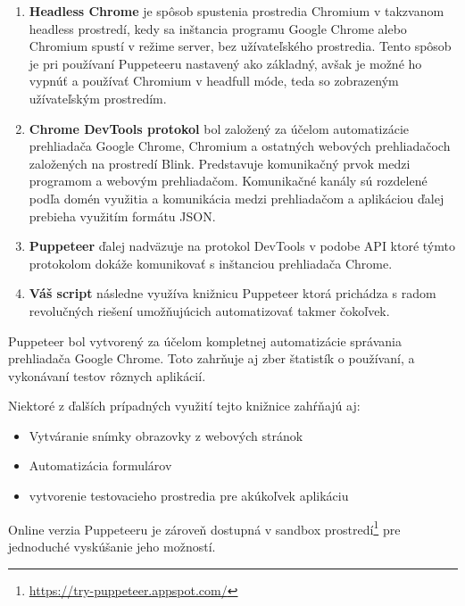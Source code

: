 \begin{enumerate}
  \item \textbf{Headless Chrome} je spôsob spustenia prostredia Chromium v takzvanom headless prostredí, kedy sa inštancia programu Google Chrome alebo Chromium spustí v režime server, bez užívateľského prostredia. Tento spôsob je pri používaní Puppeteeru nastavený ako základný, avšak je možné ho vypnúť a používať Chromium v headfull móde, teda so zobrazeným užívateľským prostredím.\cite{chromium}
  \item \textbf{Chrome DevTools protokol} bol založený za účelom automatizácie prehliadača Google Chrome, Chromium a ostatných webových prehliadačoch založených na prostredí Blink. Predstavuje komunikačný prvok medzi programom a webovým prehliadačom. Komunikačné kanály sú rozdelené podľa domén využitia a komunikácia medzi prehliadačom a aplikáciou ďalej prebieha využitím formátu JSON.\cite{devtools}
  \item \textbf{Puppeteer} ďalej nadväzuje na protokol DevTools v podobe API ktoré týmto protokolom dokáže komunikovať s inštanciou prehliadača Chrome. 
  \item \textbf{Váš script} následne využíva knižnicu Puppeteer ktorá prichádza s radom revolučných riešení umožňujúcich automatizovať takmer čokoľvek.
\end{enumerate}

\newpage

Puppeteer bol vytvorený za účelom kompletnej automatizácie správania prehliadača Google Chrome. Toto zahrňuje aj zber štatistík o používaní, a vykonávaní testov rôznych aplikácií.

Niektoré z ďalších prípadných využití tejto knižnice zahŕňajú aj:\cite{puppeteer}
\begin{itemize}
    \item {Vytváranie snímky obrazovky z webových stránok}
    \item {Automatizácia formulárov}
    \item {vytvorenie testovacieho prostredia pre akúkoľvek aplikáciu}
\end{itemize}

\bigskip

Online verzia Puppeteeru je zároveň dostupná v sandbox prostredí\footnote{\url{https://try-puppeteer.appspot.com/}} pre jednoduché vyskúšanie jeho možností.

\bigskip

